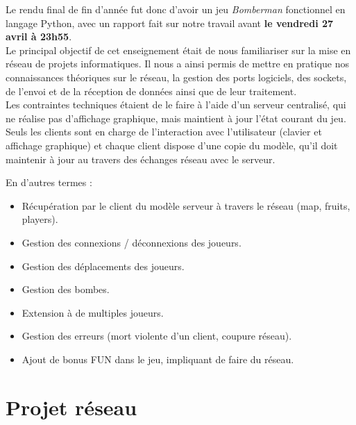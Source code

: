 \documentclass[a4paper]{article}
\begin{document}
Le rendu final de fin d'année fut donc d'avoir un jeu \textit{Bomberman} fonctionnel en langage Python, avec un rapport fait sur notre travail avant \textbf{le vendredi 27 avril à 23h55}.
\\

Le principal objectif de cet enseignement était de nous familiariser sur la mise en réseau de projets informatiques.
Il nous a ainsi permis de mettre en pratique nos connaissances théoriques sur le réseau, la gestion des ports logiciels, des sockets, de l'envoi et de la réception de données ainsi que de leur traitement.
\\

Les contraintes techniques étaient de le faire à l'aide d'un serveur centralisé, qui ne réalise pas d'affichage graphique, mais maintient à jour l'état courant du jeu.
Seuls les clients sont en charge de l'interaction avec l'utilisateur (clavier et affichage graphique) et chaque client dispose d'une copie du modèle, qu'il doit maintenir à jour au travers des échanges réseau avec le serveur.

	En d'autres termes :
	\begin{itemize}
\item Récupération par le client du modèle serveur à travers le réseau (map, fruits, players).
\item Gestion des connexions / déconnexions des joueurs.
\item Gestion des déplacements des joueurs.
\item Gestion des bombes.
\item Extension à de multiples joueurs.
\item Gestion des erreurs (mort violente d'un client, coupure réseau).
\item Ajout de bonus FUN dans le jeu, impliquant de faire du réseau.
	\end{itemize}


\newpage
\part{Projet réseau}
\end{document}
